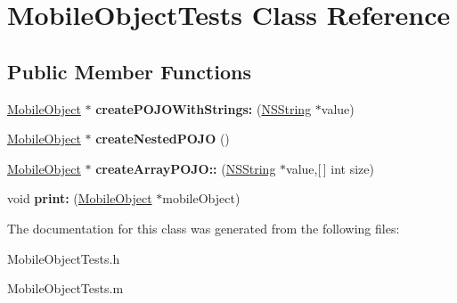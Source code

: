 \hypertarget{interface_mobile_object_tests}{
\section{\-Mobile\-Object\-Tests \-Class \-Reference}
\label{interface_mobile_object_tests}
}
\subsection*{\-Public \-Member \-Functions}
\begin{DoxyCompactItemize}
\item 
\hypertarget{interface_mobile_object_tests_aa9dded2e3a6b4424cbd7957ce4cdb321}{
\hyperlink{interface_mobile_object}{\-Mobile\-Object} $\ast$ {\bfseries create\-P\-O\-J\-O\-With\-Strings\-:} (\hyperlink{class_n_s_string}{\-N\-S\-String} $\ast$value)}
\label{interface_mobile_object_tests_aa9dded2e3a6b4424cbd7957ce4cdb321}

\item 
\hypertarget{interface_mobile_object_tests_a4cce7f586ae886bd62af46d3d8e77c11}{
\hyperlink{interface_mobile_object}{\-Mobile\-Object} $\ast$ {\bfseries create\-Nested\-P\-O\-J\-O} ()}
\label{interface_mobile_object_tests_a4cce7f586ae886bd62af46d3d8e77c11}

\item 
\hypertarget{interface_mobile_object_tests_aa52beba959731f89c9746f648623cccc}{
\hyperlink{interface_mobile_object}{\-Mobile\-Object} $\ast$ {\bfseries create\-Array\-P\-O\-J\-O\-::} (\hyperlink{class_n_s_string}{\-N\-S\-String} $\ast$value,\mbox{[}$\,$\mbox{]} int size)}
\label{interface_mobile_object_tests_aa52beba959731f89c9746f648623cccc}

\item 
\hypertarget{interface_mobile_object_tests_a44f161c9cd4e4392a64e8644be645f1a}{
void {\bfseries print\-:} (\hyperlink{interface_mobile_object}{\-Mobile\-Object} $\ast$mobile\-Object)}
\label{interface_mobile_object_tests_a44f161c9cd4e4392a64e8644be645f1a}

\end{DoxyCompactItemize}


\-The documentation for this class was generated from the following files\-:\begin{DoxyCompactItemize}
\item 
\-Mobile\-Object\-Tests.\-h\item 
\-Mobile\-Object\-Tests.\-m\end{DoxyCompactItemize}

